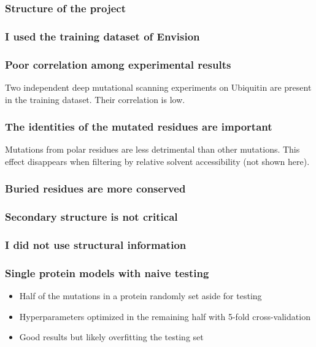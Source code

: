 \documentclass[10pt, british]{beamer}
\begin{document}
\begin{frame}
	\frametitle{Structure of the project}
	\begin{figure}
		
	\end{figure}
\end{frame}

\begin{frame}
	\frametitle{I used the training dataset of Envision \parencite{Gray2018}}
	\vfill%
	\centering%
	
	
\end{frame}

\begin{frame}
	\frametitle{Poor correlation among experimental results}
	Two independent deep mutational scanning experiments on Ubiquitin are present in the training dataset.
	Their correlation is low.
	\vfill%
	\centering%
	
\end{frame}

\begin{frame}
	\frametitle{The identities of the mutated residues are important}
	Mutations from polar residues are less detrimental than other mutations.
	This effect disappears when filtering by relative solvent accessibility (not shown here).
	\vfill%
	\centering%
	
\end{frame}

\begin{frame}
	\frametitle{Buried residues are more conserved}
	\centering%
	
\end{frame}

\begin{frame}
	\frametitle{Secondary structure is not critical}
	\centering%
	
\end{frame}

\begin{frame}
	\frametitle{I did not use structural information}
	\centering%
	\begin{figure}
		
	\end{figure}
\end{frame}

\begin{frame}
	\frametitle{Single protein models with naive testing}
	\begin{itemize}
		\item Half of the mutations in a protein randomly set aside for testing
		\item Hyperparameters optimized in the remaining half with 5-fold cross-validation
		\item Good results but likely overfitting the testing set
	\end{itemize}
	\vfill%
	\centering%
	
\end{frame}
\end{document}

